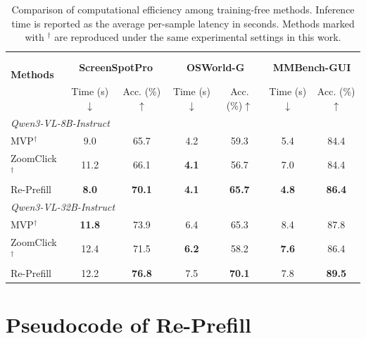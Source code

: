\documentclass{article}
\newcommand{\repro}{$^{\dagger}$}
\begin{document}
\begin{table}[t]
\caption{Comparison of computational efficiency among training-free methods. Inference time is reported as the average per-sample latency in seconds. Methods marked with \repro{} are reproduced under the same experimental settings in this work.}
\label{tab:comp_overhead}
\footnotesize
\centering
\begin{tabular}{l cc cc cc}
\toprule
\makecell[l]{\\ \textbf{Methods} \\}
& \multicolumn{2}{c}{\textbf{ScreenSpotPro}}\vspace{-1pt} 
& \multicolumn{2}{c}{\textbf{OSWorld-G}}\vspace{-1pt}  
& \multicolumn{2}{c}{\textbf{MMBench-GUI}}\vspace{-1pt} \\
\cmidrule(lr){2-3} \cmidrule(lr){4-5} \cmidrule(lr){6-7}
 & Time (s)$\downarrow$ & Acc. (\%)$\uparrow$ 
 & Time (s)$\downarrow$ & Acc. (\%)$\uparrow$ 
 & Time (s)$\downarrow$ & Acc. (\%)$\uparrow$ \\
\midrule

\multicolumn{7}{l}{\textit{Qwen3-VL-8B-Instruct}} \vspace{2pt} \\
MVP\repro  & 9.0 & 65.7 & 4.2 & 59.3 & 5.4 & 84.4 \\
ZoomClick\repro  & 11.2 & 66.1 & \textbf{4.1} & 56.7 & 7.0 & 84.4 \\
Re-Prefill & \textbf{8.0} & \textbf{70.1} & \textbf{4.1} & \textbf{65.7} & \textbf{4.8} & \textbf{86.4} \\

\midrule

\multicolumn{7}{l}{\textit{Qwen3-VL-32B-Instruct}} \vspace{2pt} \\
MVP\repro        & \textbf{11.8} & 73.9 & 6.4 & 65.3 & 8.4 & 87.8 \\
ZoomClick\repro  & 12.4 & 71.5 & \textbf{6.2} & 58.2 & \textbf{7.6} & 86.4 \\
Re-Prefill & 12.2 & \textbf{76.8} & 7.5 & \textbf{70.1} & 7.8 & \textbf{89.5} \\

\bottomrule
\end{tabular}
\end{table}


\section{Pseudocode of Re-Prefill}
\label{app:algorithm}
\end{document}
